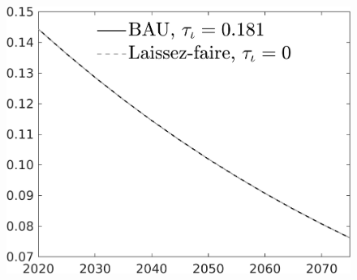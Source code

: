 \documentclass[12pt]{article}
\begin{document}
\begin{figure}[h!!]
\begin{minipage}[]{0.32\textwidth}
	\end{minipage}	
	\begin{minipage}[]{0.32\textwidth}
		\includegraphics[width=1\textwidth]{../../codding_model/own_basedOnFried/optimalPol_010922_revision/figures/all_13Sept22/CompTaul_LFBAU_Reg0_LgLf_spillover0_nsk1_xgr1_knspil1_sep1_countec0_GovRev0_etaa0.79_lgd1.png}
	\end{minipage}	
\end{figure}
\end{document}
